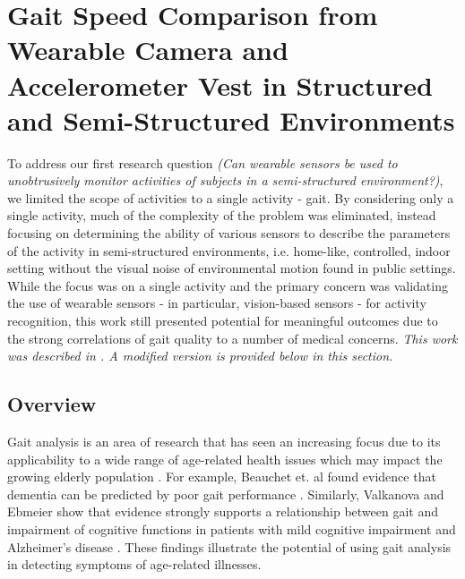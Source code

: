 \documentclass[12pt]{report}
\begin{document}
\section{Gait Speed Comparison from Wearable Camera and Accelerometer Vest in Structured and Semi-Structured Environments}
To address our first research question \emph{(Can wearable sensors be used to unobtrusively monitor activities of subjects in a semi-structured environment?)}, we limited the scope of activities to a single activity - gait. By considering only a single activity, much of the complexity of the problem was eliminated, instead focusing on determining the ability of various sensors to describe the parameters of the activity in semi-structured environments, i.e. home-like, controlled, indoor setting without the visual noise of environmental motion found in public settings. While the focus was on a single activity and the primary concern was validating the use of wearable sensors - in particular, vision-based sensors - for activity recognition, this work still presented potential for meaningful outcomes due to the strong correlations of gait quality to a number of medical concerns. \emph{This work was described in \cite{Schneider2019ComparisonEnvironments}. A modified version is provided below in this section.}

\subsection{Overview}

Gait analysis is an area of research that has seen an increasing focus due to its applicability to a wide range of age-related health issues which may impact the growing elderly population \cite{Ortman2014AnStates}. For example, Beauchet et. al found evidence that dementia can be predicted by poor gait performance \cite{Beauchet2016PoorMeta-Analysis}. Similarly, Valkanova and Ebmeier show that evidence strongly supports a relationship between gait and impairment of cognitive functions in patients with mild cognitive impairment and Alzheimer's disease \cite{Valkanova2017WhatEvidence}. These findings illustrate the potential of using gait analysis in detecting symptoms of age-related illnesses.
\end{document}
